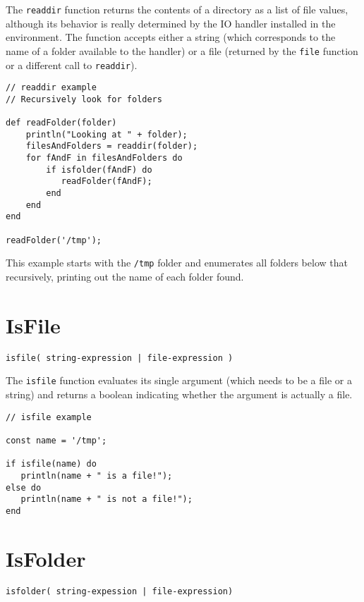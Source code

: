 The \Verb+readdir+ function returns the contents of a directory as a list of file values, although its behavior is really determined by the IO handler installed in the \Reflex environment. The function accepts either a string (which corresponds to the name of a folder available to the handler) or a file (returned by the \verb+file+ function or a different call to \verb+readdir+).

\begin{lstlisting}[caption={readdir example}]
// readdir example
// Recursively look for folders

def readFolder(folder)
    println("Looking at " + folder);
    filesAndFolders = readdir(folder);
    for fAndF in filesAndFolders do
        if isfolder(fAndF) do
           readFolder(fAndF);
        end
    end
end

readFolder('/tmp');

\end{lstlisting}

This example starts with the \Verb+/tmp+ folder and enumerates all folders below that recursively, printing out the name of each folder found.

\section{IsFile}

\begin{Verbatim}
isfile( string-expression | file-expression )
\end{Verbatim}

The \Verb+isfile+ function evaluates its single argument (which needs to be a file or a string) and returns a boolean indicating whether the argument is actually a file.

\begin{lstlisting}[caption={IsFile example}]
// isfile example

const name = '/tmp';

if isfile(name) do
   println(name + " is a file!");
else do
   println(name + " is not a file!");
end

\end{lstlisting}

\section{IsFolder}

\begin{Verbatim}
isfolder( string-expession | file-expression)
\end{Verbatim}

